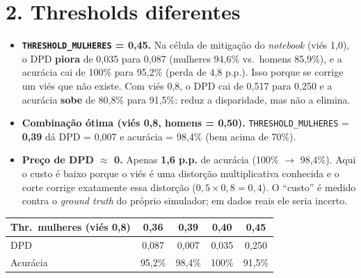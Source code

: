 \documentclass[10pt,a4paper]{article}
\begin{document}
\section*{2. Thresholds diferentes}
\begin{itemize}
  \item \textbf{\texttt{THRESHOLD\_MULHERES} = 0,45.} Na c\'elula de mitiga\c{c}\~ao do \textit{notebook} (vi\'es 1,0), o DPD \textbf{piora} de 0,035 para 0,087 (mulheres 94,6\% vs.\ homens 85,9\%), e a acur\'acia cai de 100\% para 95,2\% (perda de 4,8 p.p.). Isso porque se corrige um vi\'es que n\~ao existe. Com vi\'es 0,8, o DPD cai de 0,517 para 0,250 e a acur\'acia \textbf{sobe} de 80,8\% para 91,5\%: reduz a disparidade, mas n\~ao a elimina.
  \item \textbf{Combina\c{c}\~ao \'otima (vi\'es 0,8, homens = 0,50).} \texttt{THRESHOLD\_MULHERES} = \textbf{0,39} d\'a DPD = 0,007 e acur\'acia = 98,4\% (bem acima de 70\%).
  \item \textbf{Pre\c{c}o de DPD $\approx$ 0.} Apenas \textbf{1,6 p.p.} de acur\'acia (100\% $\to$ 98,4\%). Aqui o custo \'e baixo porque o vi\'es \'e uma distor\c{c}\~ao multiplicativa conhecida e o corte corrige exatamente essa distor\c{c}\~ao ($0{,}5\times 0{,}8 = 0{,}4$). O ``custo'' \'e medido contra o \textit{ground truth} do pr\'oprio simulador; em dados reais ele seria incerto.
\end{itemize}

\begin{center}
\small
\begin{tabular}{@{}lcccc@{}}
\toprule
Thr.\ mulheres (vi\'es 0,8) & 0,36 & 0,39 & 0,40 & 0,45 \\ \midrule
DPD & 0,087 & 0,007 & 0,035 & 0,250 \\
Acur\'acia & 95,2\% & 98,4\% & 100\% & 91,5\% \\ \bottomrule
\end{tabular}
\end{center}
\end{document}
